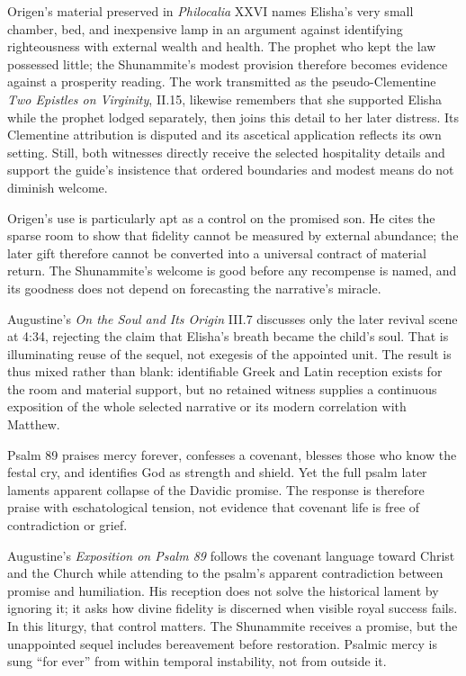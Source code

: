 \begin{deepstudy}
Origen's material preserved in \emph{Philocalia} XXVI names Elisha's very small chamber, bed, and inexpensive lamp in an argument against identifying righteousness with external wealth and health. The prophet who kept the law possessed little; the Shunammite's modest provision therefore becomes evidence against a prosperity reading. The work transmitted as the pseudo-Clementine \emph{Two Epistles on Virginity}, II.15, likewise remembers that she supported Elisha while the prophet lodged separately, then joins this detail to her later distress. Its Clementine attribution is disputed and its ascetical application reflects its own setting. Still, both witnesses directly receive the selected hospitality details and support the guide's insistence that ordered boundaries and modest means do not diminish welcome.

Origen's use is particularly apt as a control on the promised son. He cites the sparse room to show that fidelity cannot be measured by external abundance; the later gift therefore cannot be converted into a universal contract of material return. The Shunammite's welcome is good before any recompense is named, and its goodness does not depend on forecasting the narrative's miracle.

Augustine's \emph{On the Soul and Its Origin} III.7 discusses only the later revival scene at 4:34, rejecting the claim that Elisha's breath became the child's soul. That is illuminating reuse of the sequel, not exegesis of the appointed unit. The result is thus mixed rather than blank: identifiable Greek and Latin reception exists for the room and material support, but no retained witness supplies a continuous exposition of the whole selected narrative or its modern correlation with Matthew.

Psalm 89 praises mercy forever, confesses a covenant, blesses those who know the festal cry, and identifies God as strength and shield. Yet the full psalm later laments apparent collapse of the Davidic promise. The response is therefore praise with eschatological tension, not evidence that covenant life is free of contradiction or grief.

Augustine's \emph{Exposition on Psalm 89} follows the covenant language toward Christ and the Church while attending to the psalm's apparent contradiction between promise and humiliation. His reception does not solve the historical lament by ignoring it; it asks how divine fidelity is discerned when visible royal success fails. In this liturgy, that control matters. The Shunammite receives a promise, but the unappointed sequel includes bereavement before restoration. Psalmic mercy is sung “for ever” from within temporal instability, not from outside it.


\end{deepstudy}
